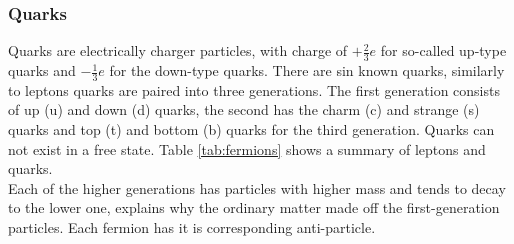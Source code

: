 \subsubsection{Quarks}
Quarks are electrically charger particles, with charge of $+\frac{2}{3}e$ for so-called up-type quarks and $-\frac{1}{3}e$ for the down-type quarks. There are sin known quarks, similarly to leptons quarks are paired into three generations. The first generation consists of up (u) and down (d) quarks, the second has the charm (c) and strange (s) quarks and top (t) and bottom (b) quarks for the third generation. Quarks can not exist in a free state. Table \ref{tab:fermions} shows a summary of leptons and quarks. \\
Each of the higher generations has particles with higher mass and tends to decay to the lower one, explains why the ordinary matter made off the first-generation particles. Each fermion has it is corresponding anti-particle.
